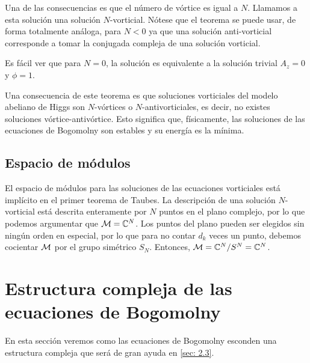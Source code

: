 Una de las consecuencias es que el número de vórtice es igual a $N$. Llamamos a esta solución una solución $N$-vorticial. Nótese que el teorema se puede usar, de forma totalmente análoga, para $N<0$ ya que una solución anti-vorticial corresponde a tomar la conjugada compleja de una solución vorticial.

Es fácil ver que para $N=0$, la solución es equivalente a la solución trivial $A_z=0$ y $\phi=1$.


Una consecuencia de este teorema es que soluciones vorticiales del modelo abeliano de Higgs son $N$-vórtices o $N$-antivorticiales, es decir, no existes soluciones vórtice-antivórtice. Esto significa que, físicamente, las soluciones de las ecuaciones de Bogomolny son estables y su energía es la mínima.

\subsection{Espacio de módulos}

El espacio de módulos para las soluciones de las ecuaciones vorticiales está implícito en el primer teorema de Taubes. La descripción de una solución $N$-vorticial está descrita enteramente por $N$ puntos en el plano complejo, por lo que podemos argumentar que $\mathcal{M}=\mathbb{C}^N$. Los puntos del plano pueden ser elegidos sin ningún orden en especial, por lo que para no contar $d_k$ veces un punto, debemos cocientar $\mathcal{M}$ por el grupo simétrico $S_N$. Entonces, $\mathcal{M}=\mathbb{C}^N/S^N=\mathbb{C}^N$.

\section{Estructura compleja de las ecuaciones de Bogomolny}
\label{sec:2.2}

En esta sección veremos como las ecuaciones de Bogomolny esconden una estructura compleja que será de gran ayuda en \ref{sec: 2.3}.

